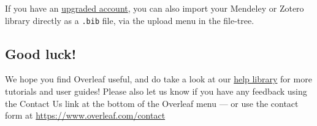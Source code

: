 \documentclass{article}
\begin{document}
If you have an \href{https://www.overleaf.com/user/subscription/plans}{upgraded account}, you can also import your Mendeley or Zotero library directly as a \verb|.bib| file, via the upload menu in the file-tree.

\subsection{Good luck!}

We hope you find Overleaf useful, and do take a look at our \href{https://www.overleaf.com/learn}{help library} for more tutorials and user guides! Please also let us know if you have any feedback using the Contact Us link at the bottom of the Overleaf menu --- or use the contact form at \url{https://www.overleaf.com/contact}
\end{document}

